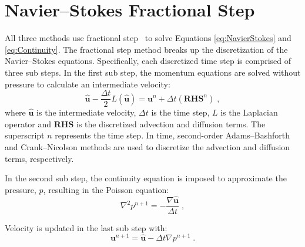 \section{Navier--Stokes Fractional Step}\label{NM:NavierStokes}
All three methods use fractional step~\cite{Perot1993} to solve Equations \eqref{eq:NavierStokes} and \eqref{eq:Continuity}. 
The fractional step method breaks up the discretization of the Navier--Stokes equations. 
Specifically, each discretized time step is comprised of three sub steps.
In the first sub step, the momentum equations are solved without pressure to  calculate an intermediate velocity:
\begin{equation}\label{eq:Intermediate Velocity}
\hat{\textbf{u}} - \frac{\Delta t}{2}L(\hat{\textbf{u}}) = \textbf{u}^n + \Delta t(\textbf{RHS}^n) \;,
\end{equation}
where $\hat{\textbf{u}}$ is the intermediate velocity, $\Delta t$ is the time step, $L$ is the Laplacian operator and $\textbf{RHS}$ is the discretized advection and diffusion terms. 
The superscript $n$ represents the time step. 
In time, second-order Adams--Bashforth and Crank--Nicolson methods are used to discretize the advection and diffusion terms, respectively. 

In the second sub step, the continuity equation is imposed to approximate the pressure, $p$, resulting in the Poisson equation:
\begin{equation}\label{eq:Poisson}
\nabla^2p^{n+1} = - \frac{\nabla\hat{\textbf{u}}}{\Delta t} \;,
\end{equation}

Velocity is updated in the last sub step with:
\begin{equation}\label{eq:Projection}
\textbf{u}^{n+1} = \hat{\textbf{u}} - \Delta t\nabla p^{n+1} \;.
\end{equation}

